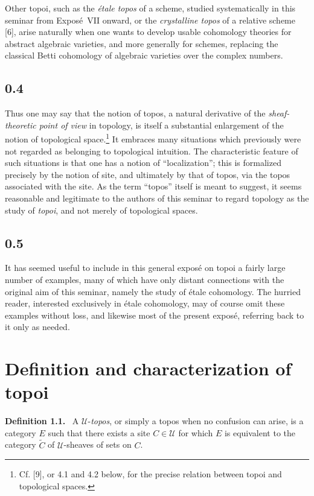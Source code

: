 \documentclass[11pt]{article}
\newcommand{\U}{\mathcal{U}}
\newenvironment{statement}[1]{\par\medskip\noindent\textbf{#1.}\ }{\par\medskip}
\begin{document}
Other topoi, such as the \emph{\'etale topos} of a scheme, studied systematically in this seminar from Expos\'e~VII onward, or the \emph{crystalline topos} of a relative scheme [6], arise naturally when one wants to develop usable cohomology theories for abstract algebraic varieties, and more generally for schemes, replacing the classical Betti cohomology of algebraic varieties over the complex numbers.

\subsection*{0.4}
Thus one may say that the notion of topos, a natural derivative of the \emph{sheaf-theoretic point of view} in topology, is itself a substantial enlargement of the notion of topological space.\footnote{Cf. [9], or 4.1 and 4.2 below, for the precise relation between topoi and topological spaces.} It embraces many situations which previously were not regarded as belonging to topological intuition. The characteristic feature of such situations is that one has a notion of ``localization''; this is formalized precisely by the notion of site, and ultimately by that of topos, via the topos associated with the site. As the term ``topos'' itself is meant to suggest, it seems reasonable and legitimate to the authors of this seminar to regard topology as the study of \emph{topoi}, and not merely of topological spaces.

\subsection*{0.5}
It has seemed useful to include in this general expos\'e on topoi a fairly large number of examples, many of which have only distant connections with the original aim of this seminar, namely the study of \'etale cohomology. The hurried reader, interested exclusively in \'etale cohomology, may of course omit these examples without loss, and likewise most of the present expos\'e, referring back to it only as needed.

\section{Definition and characterization of topoi}

\begin{statement}{Definition 1.1}
A \(\U\)-\emph{topos}, or simply a topos when no confusion can arise, is a category \(E\) such that there exists a site \(C\in\U\) for which \(E\) is equivalent to the category \(\widetilde C\) of \(\U\)-sheaves of sets on \(C\).
\end{statement}
\end{document}

